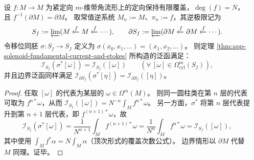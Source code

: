 \begin{proposition}\label{prop:app-solenoid-shift-invariance}
设 \(f:M\to M\) 为紧定向 \(m\)-维带角流形上的定向保持有限覆盖，\(\deg(f)=N\)，且 \(f^{-1}(\partial M)=\partial M\)。
取常值逆系统 \(M_n:=M\)、\(\pi_n:=f\)，其逆极限记为
\[
S_f:=\varprojlim(M\xleftarrow{f}M\xleftarrow{f}\cdots),
\qquad
\partial S_f:=\varprojlim(\partial M\xleftarrow{f}\partial M\xleftarrow{f}\cdots).
\]
令移位同胚 \(\sigma:S_f\to S_f\) 定义为 \(\sigma(x_0,x_1,\dots)=(x_1,x_2,\dots)\)。
则定理 \ref{thm:app-solenoid-fundamental-current-and-stokes} 所构造的泛函满足：
\[
\mathcal I_{S_f}(\sigma^\ast[\omega])=\mathcal I_{S_f}([\omega])\qquad(\forall\,[\omega]\in\Omega^m_{\mathrm{cyl}}(S_f)),
\]
并且边界泛函同样满足 \(\mathcal I_{\partial S_f}(\sigma^\ast[\eta])=\mathcal I_{\partial S_f}([\eta])\)。
\end{proposition}
\begin{proof}
任取 \([\omega]\) 的代表为某层的 \(\omega\in\Omega^m(M)\)。
则同一圆柱类在第 \(n\) 层的代表可取为 \(f^{n\ast}\omega\)，从而
\(
\mathcal I_{S_f}([\omega])=N^{-n}\int_M f^{n\ast}\omega
\)。
另一方面，\(\sigma^\ast\) 将第 \(n\) 层代表提升到第 \(n+1\) 层代表，即 \(f^{(n+1)\ast}\omega\)，故
\[
\mathcal I_{S_f}(\sigma^\ast[\omega])
=\frac{1}{N^{n+1}}\int_M f^{(n+1)\ast}\omega
=\frac{1}{N^{n}}\int_M f^{n\ast}\omega
=\mathcal I_{S_f}([\omega]),
\]
其中使用 \(\int_M f^\ast\alpha=N\int_M\alpha\)（顶次形式的覆盖次数公式）。
边界情形以 \(\partial M\) 代替 \(M\) 同理。证毕。
\end{proof}



